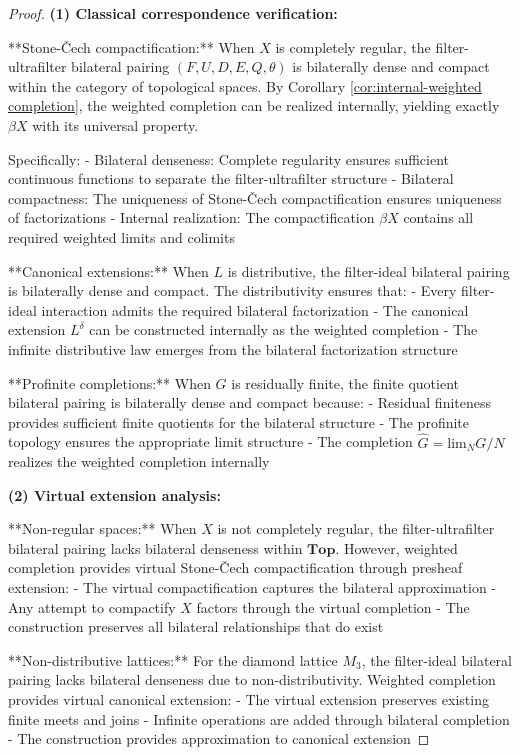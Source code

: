 \documentclass[11pt]{article}
\theoremstyle{plain}
\theoremstyle{definition}
\theoremstyle{remark}
\renewcommand{\lim}{\mathrm{lim}}
\newcommand{\wh}[1]{\widehat{#1}}
\begin{document}
\begin{proof}
\textbf{(1) Classical correspondence verification:}

**Stone-\v{C}ech compactification:** When $X$ is completely regular, the filter-ultrafilter bilateral pairing $(F, U, D, E, Q, \theta)$ is bilaterally dense and compact within the category of topological spaces. By Corollary \ref{cor:internal-weighted completion}, the weighted completion can be realized internally, yielding exactly $\beta X$ with its universal property.

Specifically:
- Bilateral denseness: Complete regularity ensures sufficient continuous functions to separate the filter-ultrafilter structure
- Bilateral compactness: The uniqueness of Stone-\v{C}ech compactification ensures uniqueness of factorizations
- Internal realization: The compactification $\beta X$ contains all required weighted limits and colimits

**Canonical extensions:** When $L$ is distributive, the filter-ideal bilateral pairing is bilaterally dense and compact. The distributivity ensures that:
- Every filter-ideal interaction admits the required bilateral factorization
- The canonical extension $L^{\delta}$ can be constructed internally as the weighted completion
- The infinite distributive law emerges from the bilateral factorization structure

**Profinite completions:** When $G$ is residually finite, the finite quotient bilateral pairing is bilaterally dense and compact because:
- Residual finiteness provides sufficient finite quotients for the bilateral structure
- The profinite topology ensures the appropriate limit structure
- The completion $\wh{G} = \lim_{N} G/N$ realizes the weighted completion internally

\textbf{(2) Virtual extension analysis:}

**Non-regular spaces:** When $X$ is not completely regular, the filter-ultrafilter bilateral pairing lacks bilateral denseness within $\mathbf{Top}$. However, weighted completion provides virtual Stone-\v{C}ech compactification through presheaf extension:
- The virtual compactification captures the bilateral approximation
- Any attempt to compactify $X$ factors through the virtual completion
- The construction preserves all bilateral relationships that do exist

**Non-distributive lattices:** For the diamond lattice $M_3$, the filter-ideal bilateral pairing lacks bilateral denseness due to non-distributivity. Weighted completion provides virtual canonical extension:
- The virtual extension preserves existing finite meets and joins
- Infinite operations are added through bilateral completion
- The construction provides approximation to canonical extension


\end{proof}
\end{document}
